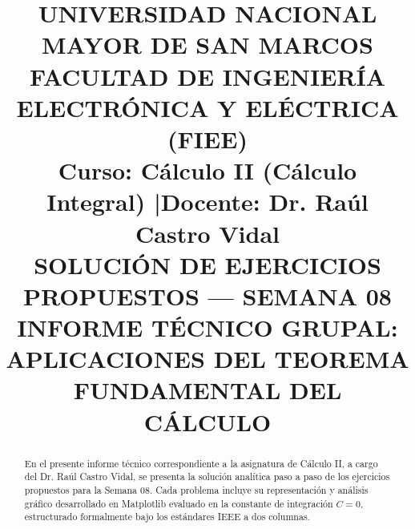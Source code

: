 \documentclass[conference]{IEEEtran}
\newcommand{\NumeroSemana}{08}
\newcommand{\TemaSemana}{APLICACIONES DEL TEOREMA FUNDAMENTAL DEL CÁLCULO}
\begin{document}
	
	\title{UNIVERSIDAD NACIONAL MAYOR DE SAN MARCOS\\
		\Large FACULTAD DE INGENIERÍA ELECTRÓNICA Y ELÉCTRICA (FIEE)\\
		\vspace{0.3cm}
		\large \textbf{Curso:} Cálculo II (Cálculo Integral) \quad|\quad \textbf{Docente:} Dr. Raúl Castro Vidal\\
		\vspace{0.4cm}
		\huge SOLUCIÓN DE EJERCICIOS PROPUESTOS --- SEMANA \NumeroSemana\\
		\LARGE INFORME TÉCNICO GRUPAL: \TemaSemana}
	
	\author{
		\and
		\and
		\vspace{0.4cm}
		\and
		\and
		\and
	}
	
	\maketitle
	
	\begin{abstract}
		En el presente informe técnico correspondiente a la asignatura de Cálculo II, a cargo del Dr. Raúl Castro Vidal, se presenta la solución analítica paso a paso de los ejercicios propuestos para la Semana \NumeroSemana. Cada problema incluye su representación y análisis gráfico desarrollado en Matplotlib evaluado en la constante de integración $C=0$, estructurado formalmente bajo los estándares IEEE a dos columnas.
	\end{abstract}
	
\end{document}
